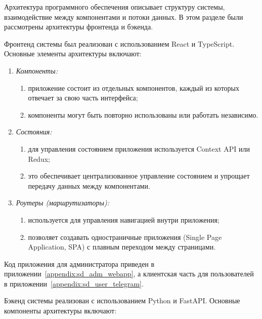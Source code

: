 Архитектура программного обеспечения описывает структуру системы, взаимодействие между компонентами и потоки данных. В этом разделе были рассмотрены архитектуры фронтенда и бэкенда.

Фронтенд системы был реализован с использованием React и TypeScript. Основные элементы архитектуры включают:

\begin{enumerate}
    \item \textit{Компоненты:}
    \begin{enumerate}
        \item приложение состоит из отдельных компонентов, каждый из которых отвечает за свою часть интерфейса;
        \item компоненты могут быть повторно использованы или работать независимо.
    \end{enumerate}
    \item \textit{Состояния:}
    \begin{enumerate}
        \item для управления состоянием приложения используется Context API или Redux;
        \item это обеспечивает централизованное управление состоянием и упрощает передачу данных между компонентами.
    \end{enumerate}
    \item \textit{Роутеры (маршрутизаторы):}
    \begin{enumerate}
        \item используется для управления навигацией внутри приложения;
        \item позволяет создавать одностраничные приложения (Single Page Application, SPA) с плавным переходом между страницами.
    \end{enumerate}
\end{enumerate}

Код приложения для администратора приведен в приложении~\ref{appendix:sd_adm_webapp}, а клиентская часть для пользователей в приложении~\ref{appendix:sd_user_telegram}.

Бэкенд системы реализован с использованием Python и FastAPI. Основные компоненты архитектуры включают:

